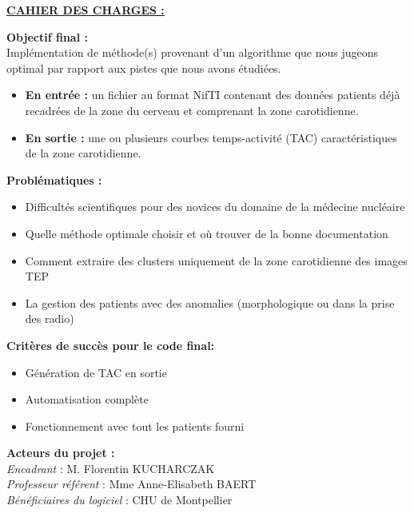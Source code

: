 \documentclass{article}
\begin{document}
    \vspace{0.5cm}
\noindent\underline{\textbf{CAHIER DES CHARGES :}}

    \vspace{0.2cm}
    \noindent\textbf{Objectif final :}\\
    Implémentation de méthode(s) provenant d’un algorithme que nous jugeons optimal par rapport aux pistes que nous avons étudiées.
    \begin{itemize}
        \item \textbf{En entrée :} un fichier au format NifTI contenant des données patients déjà recadrées de la zone du cerveau et comprenant la zone carotidienne.
        \item \textbf{En sortie :} une ou plusieurs courbes temps-activité (TAC) caractéristiques de la zone carotidienne.
    \end{itemize}

    \vspace{0.2cm}
    \noindent\textbf{Problématiques :}
    \begin{itemize}
        \item Difficultés scientifiques pour des novices du domaine de la médecine nucléaire 
        \item Quelle méthode optimale choisir et où trouver de la bonne documentation
        \item Comment extraire des clusters uniquement de la zone carotidienne des images TEP
        \item La gestion des patients avec des anomalies (morphologique ou dans la prise des radio)\\
    \end{itemize}
    
    \noindent\textbf{Critères de succès pour le code final:}
    \begin{itemize}
        \item Génération de TAC en sortie
        \item Automatisation complète 
        \item Fonctionnement avec tout les patients fourni\\
    \end{itemize}
    
    
    \noindent\textbf{Acteurs du projet :}\\
    \textit{Encadrant} : M. Florentin KUCHARCZAK\\
    \textit{Professeur référent} : Mme Anne-Elisabeth BAERT\\
    \textit{Bénéficiaires du logiciel} : CHU de Montpellier\\
    
\end{document}
